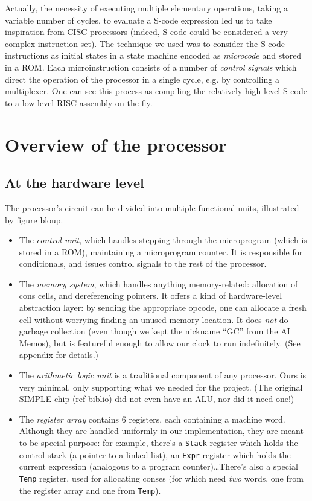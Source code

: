\documentclass[a4paper, 11pt]{article}
\begin{document}
Actually, the necessity of executing multiple elementary operations, taking a variable number of cycles, to evaluate a S-code expression led us to take inspiration from CISC processors (indeed, S-code could be considered a very complex instruction set). The technique we used was to consider the S-code instructions as initial states in a state machine encoded as \emph{microcode} and stored in a ROM. Each microinstruction consists of a number of \emph{control signals} which direct the operation of the processor in a single cycle, e.g. by controlling a multiplexer. One can see this process as compiling the relatively high-level S-code to a low-level RISC assembly on the fly.

\section{Overview of the processor}

\subsection{At the hardware level}

The processor's circuit can be divided into multiple functional units, illustrated by figure bloup.
\begin{itemize}
\item The \emph{control unit}, which handles stepping through the microprogram (which is stored in a ROM), maintaining a microprogram counter. It is responsible for conditionals, and issues control signals to the rest of the processor. 
\item The \emph{memory system}, which handles anything memory-related: allocation of cons cells, and dereferencing pointers. It offers a kind of hardware-level abstraction layer: by sending the appropriate opcode, one can allocate a fresh cell without worrying finding an unused memory location. It does \emph{not} do garbage collection (even though we kept the nickname \enquote{GC} from the AI Memos), but is featureful enough to allow our clock to run indefinitely. (See appendix for details.)
\item The \emph{arithmetic logic unit} is a traditional component of any processor. Ours is very minimal, only supporting what we needed for the project. (The original SIMPLE chip (ref biblio) did not even have an ALU, nor did it need one!)
\item The \emph{register array} contains 6 registers, each containing a machine word. Although they are handled uniformly in our implementation, they are meant to be special-purpose: for example, there's a \texttt{Stack} register which holds the control stack (a pointer to a linked list), an \texttt{Expr} register which holds the current expression (analogous to a program counter)\dots There's also a special \texttt{Temp} register, used for allocating conses (for which need \emph{two} words, one from the register array and one from \texttt{Temp}).
\end{itemize}
\end{document}
